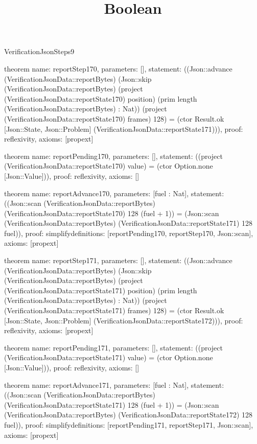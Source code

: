 \begin{lexlean}{VerificationJsonSteps9}
\title{Boolean}
\begin{semanticmodule}

theorem{
  name: reportStep170,
  parameters: [],
  statement: ((Json::advance (VerificationJsonData::reportBytes) (Json::skip (VerificationJsonData::reportBytes) (project (VerificationJsonData::reportState170) position) (prim length (VerificationJsonData::reportBytes) : Nat)) (project (VerificationJsonData::reportState170) frames) 128) = (ctor Result.ok [Json::State, Json::Problem] (VerificationJsonData::reportState171))),
  proof: reflexivity{},
  axioms: [propext]
}

theorem{
  name: reportPending170,
  parameters: [],
  statement: ((project (VerificationJsonData::reportState170) value) = (ctor Option.none [Json::Value])),
  proof: reflexivity{},
  axioms: []
}

theorem{
  name: reportAdvance170,
  parameters: [fuel : Nat],
  statement: ((Json::scan (VerificationJsonData::reportBytes) (VerificationJsonData::reportState170) 128 (fuel + 1)) = (Json::scan (VerificationJsonData::reportBytes) (VerificationJsonData::reportState171) 128 fuel)),
  proof: simplify{definitions: [reportPending170, reportStep170, Json::scan]},
  axioms: [propext]
}

theorem{
  name: reportStep171,
  parameters: [],
  statement: ((Json::advance (VerificationJsonData::reportBytes) (Json::skip (VerificationJsonData::reportBytes) (project (VerificationJsonData::reportState171) position) (prim length (VerificationJsonData::reportBytes) : Nat)) (project (VerificationJsonData::reportState171) frames) 128) = (ctor Result.ok [Json::State, Json::Problem] (VerificationJsonData::reportState172))),
  proof: reflexivity{},
  axioms: [propext]
}

theorem{
  name: reportPending171,
  parameters: [],
  statement: ((project (VerificationJsonData::reportState171) value) = (ctor Option.none [Json::Value])),
  proof: reflexivity{},
  axioms: []
}

theorem{
  name: reportAdvance171,
  parameters: [fuel : Nat],
  statement: ((Json::scan (VerificationJsonData::reportBytes) (VerificationJsonData::reportState171) 128 (fuel + 1)) = (Json::scan (VerificationJsonData::reportBytes) (VerificationJsonData::reportState172) 128 fuel)),
  proof: simplify{definitions: [reportPending171, reportStep171, Json::scan]},
  axioms: [propext]
}


\end{semanticmodule}
\end{lexlean}
